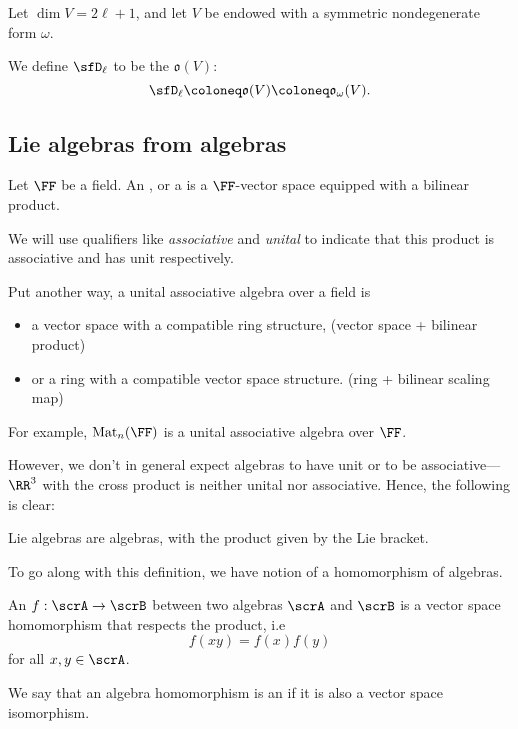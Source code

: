 \documentclass{article}
\DeclareMathOperator{\Mat}{Mat}
\newcommand*\oalg{\ensuremath{\mathfrak{o}}}
\begin{document}
\begin{definition}
    Let $\dim V = 2\ell+1$, and let $V$ be endowed with a symmetric nondegenerate form $\omega$.

    We define $\sfD_\ell$ to be the  $\oalg(V)$:
    \[
        \sfD_\ell
        \coloneq
        \oalg(V)
        \coloneq
        \oalg_\omega(V).
    \]
\end{definition}

\subsection{Lie algebras from algebras}

\begin{definition}
    Let $\FF$ be a field.
    An , or a  is a $\FF$-vector space equipped with a bilinear product.

    We will use qualifiers like \textit{associative} and \textit{unital} to indicate that this product is associative and has unit respectively.
\end{definition}

Put another way, a unital associative algebra over a field is 
\begin{itemize}
    \item 
        a vector space with a compatible ring structure, (vector space + bilinear product)
    \item 
        or a ring with a compatible vector space structure.
        (ring + bilinear scaling map)
\end{itemize}
For example, $\Mat_n(\FF)$ is a unital associative algebra over $\FF$.

However, we don't in general expect algebras to have unit or to be associative--- $\RR^3$ with the cross product is neither unital nor associative.
Hence, the following is clear:

\begin{proposition}
    Lie algebras are algebras, with the product given by the Lie bracket.
\end{proposition}

To go along with this definition, we have notion of a homomorphism of algebras.

\begin{definition}
    An  $f: \scrA \to \scrB$ between two algebras $\scrA$ and $\scrB$ is a vector space homomorphism that respects the product, i.e
    \[
        f(xy) 
        = 
        f(x)f(y)
    \]
    for all $x, y \in \scrA$.

    We say that an algebra homomorphism is an  if it is also a vector space isomorphism.
\end{definition}
\end{document}
